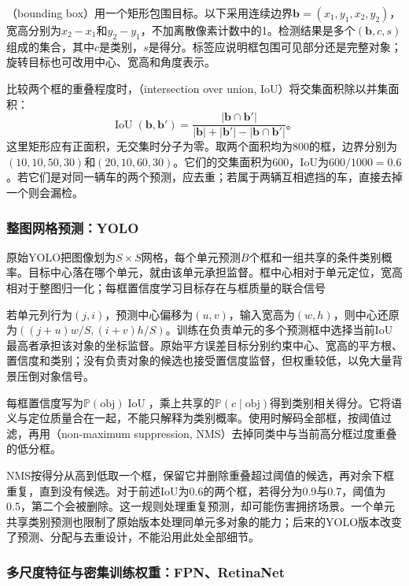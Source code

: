 （bounding box）用一个矩形包围目标。以下采用连续边界$\bm{b}=(x_1,y_1,x_2,y_2)$，宽高分别为$x_2-x_1$和$y_2-y_1$，不加离散像素计数中的1。检测结果是多个$(\bm{b},c,s)$组成的集合，其中$c$是类别，$s$是得分。标签应说明框包围可见部分还是完整对象；旋转目标也可改用中心、宽高和角度表示。

比较两个框的重叠程度时，（intersection over union, IoU）将交集面积除以并集面积：
\begin{equation}
 \operatorname{IoU}(\bm{b},\bm{b}')
 =\frac{|\bm{b}\cap\bm{b}'|}
 {|\bm{b}|+|\bm{b}'|-|\bm{b}\cap\bm{b}'|}\text{。}
 \label{eq:vision-iou}
\end{equation}
这里矩形应有正面积，无交集时分子为零。取两个面积均为800的框，边界分别为$(10,10,50,30)$和$(20,10,60,30)$。它们的交集面积为600，IoU为$600/1000=0.6$。若它们是对同一辆车的两个预测，应去重；若属于两辆互相遮挡的车，直接去掉一个则会漏检。

\subsubsection{整图网格预测：YOLO}
\label{sec:vision-recognition-yolo}

原始YOLO把图像划为$S\times S$网格，每个单元预测$B$个框和一组共享的条件类别概率。目标中心落在哪个单元，就由该单元承担监督。框中心相对于单元定位，宽高相对于整图归一化；每框置信度学习目标存在与框质量的联合信号

若单元列行为$(j,i)$，预测中心偏移为$(u,v)$，输入宽高为$(w,h)$，则中心还原为$((j+u)w/S,(i+v)h/S)$。训练在负责单元的多个预测框中选择当前IoU最高者承担该对象的坐标监督。原始平方误差目标分别约束中心、宽高的平方根、置信度和类别；没有负责对象的候选也接受置信度监督，但权重较低，以免大量背景压倒对象信号。

每框置信度写为$\mathbb{P}(\mathrm{obj})\operatorname{IoU}$，乘上共享的$\mathbb{P}(c\mid\mathrm{obj})$得到类别相关得分。它将语义与定位质量合在一起，不能只解释为类别概率。使用时解码全部框，按阈值过滤，再用（non-maximum suppression, NMS）去掉同类中与当前高分框过度重叠的低分框。

NMS按得分从高到低取一个框，保留它并删除重叠超过阈值的候选，再对余下框重复，直到没有候选。对于前述IoU为0.6的两个框，若得分为0.9与0.7，阈值为0.5，第二个会被删除。这一规则处理重复预测，却可能伤害拥挤场景。一个单元共享类别预测也限制了原始版本处理同单元多对象的能力；后来的YOLO版本改变了预测、分配与去重设计，不能沿用此处全部细节。

\subsubsection{多尺度特征与密集训练权重：FPN、RetinaNet}
\label{sec:vision-recognition-fpn}

